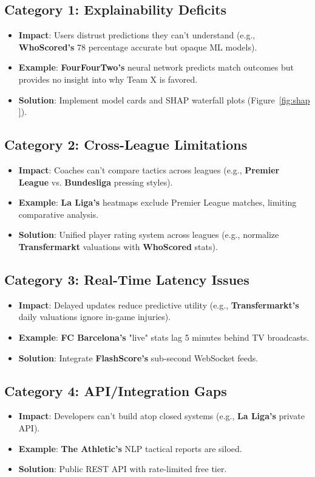 \subsection{Category 1: Explainability Deficits}
\begin{itemize}
\item \textbf{Impact}: Users distrust predictions they can’t understand (e.g., \textbf{WhoScored’s} 78 percentage accurate but opaque ML models).
\item \textbf{Example}: \textbf{FourFourTwo’s} neural network predicts match outcomes but provides no insight into why Team X is favored.
\item \textbf{Solution}: Implement model cards and SHAP waterfall plots (Figure~\ref{fig:shap }).
\end{itemize}

\subsection{Category 2: Cross-League Limitations}
\begin{itemize}
\item \textbf{Impact}: Coaches can’t compare tactics across leagues (e.g., \textbf{Premier League} vs. \textbf{Bundesliga} pressing styles).
\item \textbf{Example}: \textbf{La Liga’s} heatmaps exclude Premier League matches, limiting comparative analysis.
\item \textbf{Solution}: Unified player rating system across leagues (e.g., normalize \textbf{Transfermarkt} valuations with \textbf{WhoScored} stats).
\end{itemize}

\subsection{Category 3: Real-Time Latency Issues}
\begin{itemize}
\item \textbf{Impact}: Delayed updates reduce predictive utility (e.g., \textbf{Transfermarkt’s} daily valuations ignore in-game injuries).
\item \textbf{Example}: \textbf{FC Barcelona’s} "live" stats lag 5 minutes behind TV broadcasts.
\item \textbf{Solution}: Integrate \textbf{FlashScore’s} sub-second WebSocket feeds.
\end{itemize}

\subsection{Category 4: API/Integration Gaps}
\begin{itemize}
\item \textbf{Impact}: Developers can’t build atop closed systems (e.g., \textbf{La Liga’s} private API).
\item \textbf{Example}: \textbf{The Athletic’s} NLP tactical reports are siloed.
\item \textbf{Solution}: Public REST API with rate-limited free tier.
\end{itemize}

